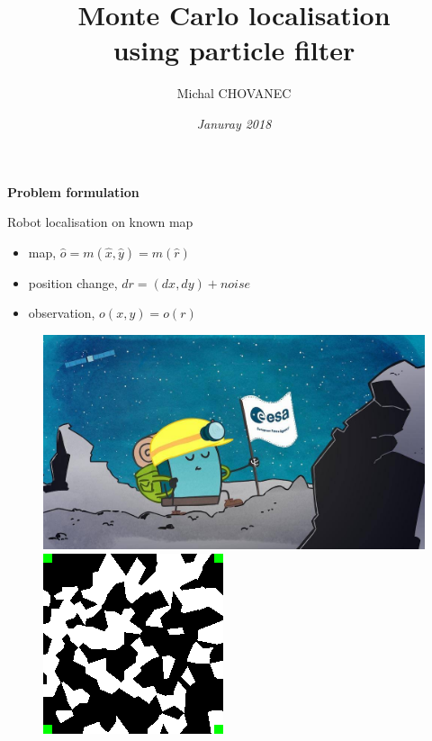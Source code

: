 \documentclass[xcolor=dvipsnames]{beamer}
\title{\bf Monte Carlo localisation \\ using particle filter}
\author{Michal CHOVANEC}
\date[EURP]{\it Januray 2018}
\begin{document}
\begin{frame}
\titlepage
\end{frame}



\begin{frame}{\bf Problem formulation}

Robot localisation on known map

\begin{itemize}
  \item map, $\hat{o} = m(\hat{x}, \hat{y}) = m(\hat{r})$
  \item position change, $dr = (dx, dy) + noise$
  \item observation, $o(x, y) = o(r)$
\end{itemize}



\begin{figure}
\centering
\begin{minipage}{.5\textwidth}
  \centering
  \includegraphics[scale=0.15]{../pictures/philae_esa.jpg}
\end{minipage}%
\begin{minipage}{.5\textwidth}
  \centering
  \includegraphics[scale=0.5]{../pictures/my_map.png}
\end{minipage}
\end{figure}


\end{frame}
\end{document}
